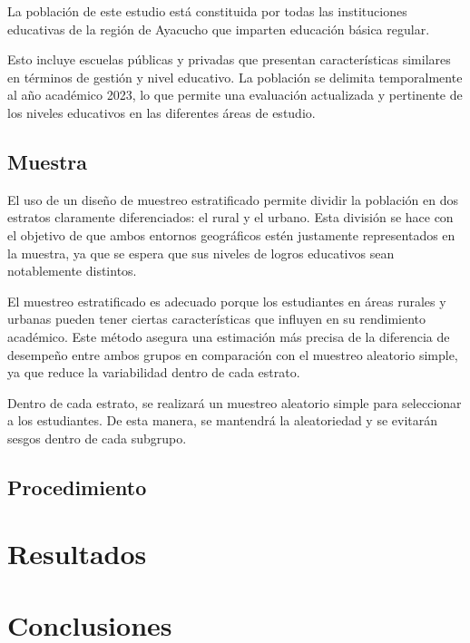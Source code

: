 \documentclass[
]{article}
\begin{document}
La población de este estudio está constituida por todas las
instituciones educativas de la región de Ayacucho que imparten educación
básica regular.

Esto incluye escuelas públicas y privadas que presentan características
similares en términos de gestión y nivel educativo. La población se
delimita temporalmente al año académico 2023, lo que permite una
evaluación actualizada y pertinente de los niveles educativos en las
diferentes áreas de estudio.

\subsection*{Muestra}\label{muestra}

El uso de un diseño de muestreo estratificado permite dividir la
población en dos estratos claramente diferenciados: el rural y el
urbano. Esta división se hace con el objetivo de que ambos entornos
geográficos estén justamente representados en la muestra, ya que se
espera que sus niveles de logros educativos sean notablemente distintos.

El muestreo estratificado es adecuado porque los estudiantes en áreas
rurales y urbanas pueden tener ciertas características que influyen en
su rendimiento académico. Este método asegura una estimación más precisa
de la diferencia de desempeño entre ambos grupos en comparación con el
muestreo aleatorio simple, ya que reduce la variabilidad dentro de cada
estrato.

Dentro de cada estrato, se realizará un muestreo aleatorio simple para
seleccionar a los estudiantes. De esta manera, se mantendrá la
aleatoriedad y se evitarán sesgos dentro de cada subgrupo.

\subsection*{Procedimiento}\label{procedimiento}

\section*{Resultados}\label{resultados}

\section*{Conclusiones}\label{conclusiones}
\end{document}
